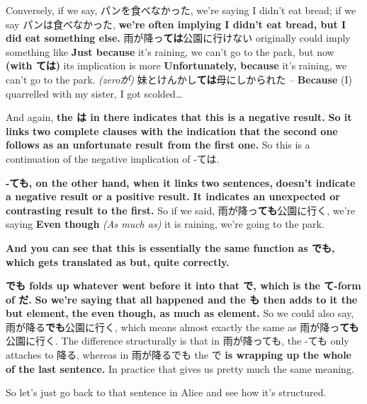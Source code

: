 Conversely, if we say, パンを食べなかった, we're saying I didn't eat bread; if we say パンは食べなかった, {\bf we're often implying I didn't eat bread, but I did eat something else.} 雨が降っ{\bf ては}公園に行けない originally could imply something like {\bf Just because} it's raining, we can't go to the park, but now {\bf (with ては)} its implication is more {\bf Unfortunately, because} it's raining, we can't go to the park. {\em (zeroが)} 妹とけんかし{\bf ては}母にしかられた -- {\bf Because} (I) quarrelled with my sister, I got scolded\ldots{}

{}

And again, {\bf the は in there indicates that this is a negative result.} {\bf So it links two complete clauses with the indication that} {\bf the second one follows as an unfortunate result from the first one.} So this is a continuation of the negative implication of -ては.

\stopsectionlevel

\startsectionlevel[title={ても / でも as a connector},reference={ても-でも-as-a-connector}]

{\bf -ても, on the other hand, when it links two sentences,} {\bf doesn't indicate a negative result or a positive result.} {\bf It indicates an unexpected or contrasting result to the first.} So if we said, 雨が降っ{\bf ても}公園に行く, we're saying {\bf Even though} {\em (As much as)} it is raining, we're going to the park.

{}

{\bf And you can see that this is essentially the same function as でも,} {\bf which gets translated as but, quite correctly.}

{}

{\bf でも folds up whatever went before it into that で, which is the て-form of だ.} {\bf So we're saying that all happened and the も then adds to it the but element,} {\bf the even though, as much as element.} So we could also say, 雨が降る{\bf でも}公園に行く, which means almost exactly the same as 雨が降っ{\bf ても}公園に行く. The difference structurally is that in 雨が降っても, the -ても only attaches to 降る, whereas in 雨が降るでも the で {\bf is wrapping up the whole of the last sentence.} In practice that gives us pretty much the same meaning.

So let's just go back to that sentence in Alice and see how it's structured.

